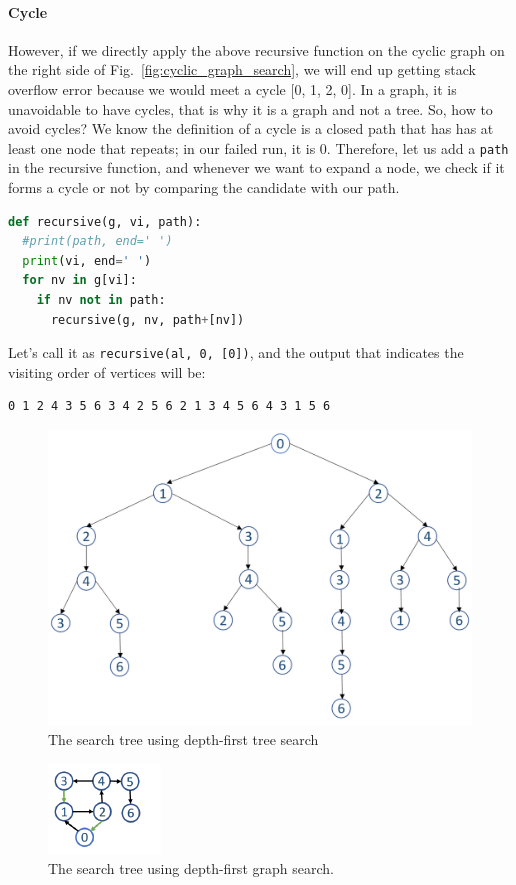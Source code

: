 \documentclass[main.tex]{subfiles}
\begin{document}
\paragraph{Cycle} However, if we directly apply the above recursive function on the cyclic graph on the right side of Fig.~\ref{fig:cyclic_graph_search}, we will end up getting stack overflow error because we would meet  a cycle [0, 1, 2, 0]. In a graph, it is unavoidable to have cycles, that is why it is a graph and not a tree. So, how to avoid cycles? We know the definition of a cycle is a closed path that has has at least one node that repeats; in our failed run, it is 0. Therefore, let us add a \texttt{path} in the recursive function, and whenever we want to expand a node, we check if it forms a cycle or not by comparing the candidate with our path. 
\begin{lstlisting}[language=Python]
def recursive(g, vi, path):
  #print(path, end=' ')
  print(vi, end=' ')
  for nv in g[vi]:  
    if nv not in path: 
      recursive(g, nv, path+[nv])
\end{lstlisting}
Let's call it as \texttt{recursive(al, 0, [0])}, and the output that indicates the visiting order of vertices will be:
\begin{lstlisting}[numbers=none]
0 1 2 4 3 5 6 3 4 2 5 6 2 1 3 4 5 6 4 3 1 5 6 
\end{lstlisting}
 \begin{figure}[!ht]
    \centering
    \includegraphics[width=0.9\columnwidth]{fig/depth_first_tree_search.png}
    \caption{The search tree using depth-first tree search }
    \label{fig:df_tree_search}
\end{figure}
\begin{figure}[!ht]
    \centering
    \includegraphics[width=0.5\columnwidth]{fig/free_tree_search.png}
    \caption{The search tree using depth-first graph search.}
    \label{fig:dfs_graph_search}
\end{figure}
\end{document}
